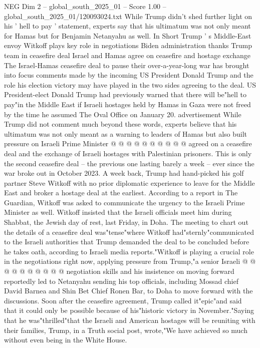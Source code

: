\begin{textsample}{NEG Dim 2 – global\_south\_2025\_01 – Score 1.00 – global\_south\_2025\_01/120093024.txt}  \label{ex:f2_neg_138}
While Trump didn't shed further light on his ' hell to pay ' statement, experts say that his ultimatum was not only meant for Hamas but for Benjamin Netanyahu as well.
In Short Trump ' s Middle-East envoy Witkoff plays key role in negotiations Biden administration thanks Trump team in ceasefire deal Israel and Hamas agree on ceasefire and hostage exchange The Israel-Hamas ceasefire deal to pause their over-a-year-long war has brought into focus comments made by the incoming US President Donald Trump and the role his election victory may have played in the two sides agreeing to the deal.
US President-elect Donald Trump had previously warned that there will be"hell to pay"in the Middle East if Israeli hostages held by Hamas in Gaza were not freed by the time he assumed The Oval Office on January 20. advertisement While Trump did not comment much beyond these words, experts believe that his ultimatum was not only meant as a warning to leaders of Hamas but also built pressure on Israeli Prime Minister @ @ @ @ @ @ @ @ @ @ agreed on a ceasefire deal and the exchange of Israeli hostages with Palestinian prisoners.
This is only the second ceasefire deal -- the previous one lasting barely a week -- ever since the war broke out in October 2023.
A week back, Trump had hand-picked his golf partner Steve Witkoff with no prior diplomatic experience to leave for the Middle East and broker a hostage deal at the earliest.
According to a report in The Guardian, Witkoff was asked to communicate the urgency to the Israeli Prime Minister as well.
Witkoff insisted that the Israeli officials meet him during Shabbat, the Jewish day of rest, last Friday, in Doha.
The meeting to chart out the details of a ceasefire deal was"tense"where Witkoff had"sternly"communicated to the Israeli authorities that Trump demanded the deal to be concluded before he takes oath, according to Israeli media reports."Witkoff is playing a crucial role in the negotiations right now, applying pressure from Trump,"a senior Israeli @ @ @ @ @ @ @ @ @ @ negotiation skills and his insistence on moving forward reportedly led to Netanyahu sending his top officials, including Mossad chief David Barnea and Shin Bet Chief Ronen Bar, to Doha to move forward with the discussions.
Soon after the ceasefire agreement, Trump called it"epic"and said that it could only be possible because of his"historic victory in November."Saying that he was"thrilled"that the Israeli and American hostages will be reuniting with their families, Trump, in a Truth social post, wrote,"We have achieved so much without even being in the White House.

\end{textsample}
